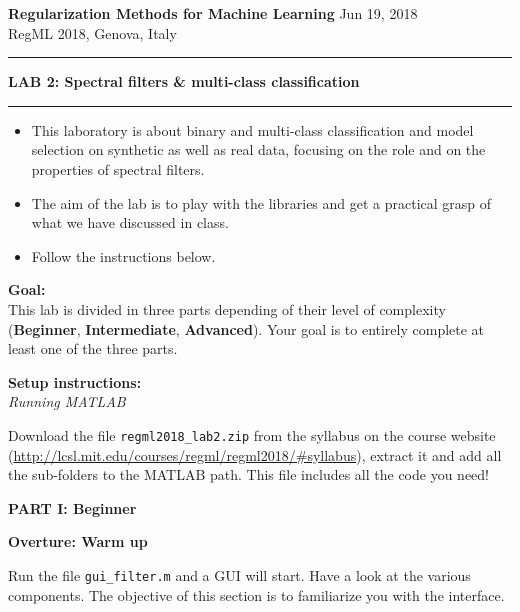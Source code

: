 \documentclass[DIN, pagenumber=false, fontsize=11pt, parskip=half]{scrartcl}
\newcommand{\mytitle}[1]{{\noindent\LARGE\textbf{#1}}}
\newcommand{\mysection}[1]{\noindent\large\textbf{#1}}
\begin{document}
\noindent\textbf{Regularization Methods for Machine Learning} \hfill Jun 19, 2018\\
RegML 2018, Genova, Italy\\ \rule{\textwidth}{1pt}

\mytitle{\center LAB 2: Spectral filters \& multi-class classification}\\
\rule{\textwidth}{1pt}
\begin{itemize}\itemsep1pt \parskip0pt 
  \item This laboratory is about binary and multi-class classification and model selection on synthetic as well as real data, focusing on the role and on the properties of spectral filters.
  \item The aim of the lab is to play with the libraries and get a practical grasp of what we have discussed in class.
  \item Follow the instructions below.  
\end{itemize}

\begin{framed}
\textbf{\textbf{Goal}:} \\
This lab is divided in three parts depending of their level of complexity (\textbf{Beginner}, \textbf{Intermediate}, \textbf{Advanced}). Your goal is to entirely complete at least one of the three parts.
\end{framed}

\begin{framed}
\textbf{\textbf{Setup instructions}:} \\
\textit{Running MATLAB}

 Download the file \texttt{regml2018\_lab2.zip} from the syllabus on the course website (\url{http://lcsl.mit.edu/courses/regml/regml2018/\#syllabus}), extract it and add all the sub-folders to the MATLAB path. This file includes all the code you need!
\end{framed}

\pagebreak
\begin{center}
\large\textbf{PART I: Beginner}
\end{center}

\mysection{Overture: Warm up}

\noindent Run the file \texttt{gui\_filter.m} and a GUI will start. Have a look at the various components.
The objective of this section is to familiarize you with the interface.
\end{document}

